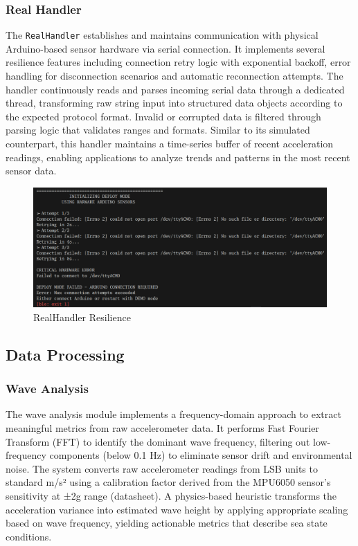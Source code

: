 \documentclass{article}
\begin{document}
    \subsubsection{Real Handler}
    The \texttt{RealHandler} establishes and maintains communication with physical Arduino-based sensor hardware via serial connection. It implements several resilience features including connection retry logic with exponential backoff, error handling for disconnection scenarios and automatic reconnection attempts. The handler continuously reads and parses incoming serial data through a dedicated thread, transforming raw string input into structured data objects according to the expected protocol format. Invalid or corrupted data is filtered through parsing logic that validates ranges and formats. Similar to its simulated counterpart, this handler maintains a time-series buffer of recent acceleration readings, enabling applications to analyze trends and patterns in the most recent sensor data.
    
    \begin{figure} [h]
        \centering
        \includegraphics[width=0.75\linewidth]{assets/RealHandler.png}
        \caption{RealHandler Resilience}
        \label{fig:enter-label}
    \end{figure}

\subsection{Data Processing}
    \subsubsection{Wave Analysis}
    The wave analysis module implements a frequency-domain approach to extract meaningful metrics from raw accelerometer data. It performs Fast Fourier Transform (FFT) to identify the dominant wave frequency, filtering out low-frequency components (below 0.1 Hz) to eliminate sensor drift and environmental noise. The system converts raw accelerometer readings from LSB units to standard m/s² using a calibration factor derived from the MPU6050 sensor's sensitivity at ±2g range (datasheet). A physics-based heuristic transforms the acceleration variance into estimated wave height by applying appropriate scaling based on wave frequency, yielding actionable metrics that describe sea state conditions.
\end{document}
